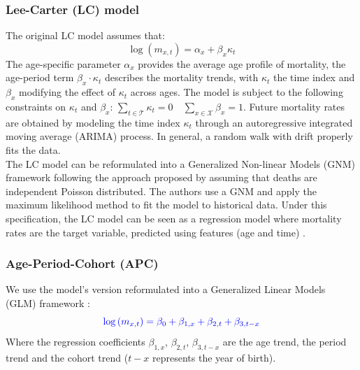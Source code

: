 \documentclass[fleqn,10pt]{wlscirep}
\begin{document}
\subsubsection*{Lee-Carter (LC) model}
The original LC model\cite{LC92} assumes that:
\begin{equation} 
\label{eq:LC}
\log{\left(m_{x,t}\right)}=\alpha_{x}+\beta_{x} \kappa_{t}
\end{equation}
The age-specific parameter $\alpha_x$ provides the average age profile of mortality, the age-period term $\beta_{x}\cdot\kappa_t$ describes the mortality trends, with $\kappa_t$ the time index and $\beta_{x}$ modifying the effect of $\kappa_t$ across ages. The model is subject to the following constraints on $\kappa_t$ and $\beta_x$: $\sum_{t \in \mathcal{T}}{\kappa_t}=0 \quad \sum_{x \in \mathcal{X}}{\beta_x}=1$.
Future mortality rates are obtained by modeling the time index $\kappa_{t}$ through an autoregressive integrated moving average (ARIMA) process. In general, a random walk with drift properly fits the data. \\
\color{blue}The LC model can be reformulated into a Generalized Non-linear Models (GNM) framework following the approach proposed by \cite{BDV2002} assuming that deaths are independent Poisson distributed. The authors use a GNM and apply the maximum likelihood method to fit the model to historical data. Under this specification, the LC model can be seen as a regression model where mortality rates are the target variable, predicted using features (age and time) \cite{RichmanWuthrich}. \color{black}

\subsubsection*{Age-Period-Cohort (APC)}
We use the model's version reformulated into a Generalized Linear Models (GLM) framework \cite{Alai2014}:
\begin{equation} 
\label{eq:APC}
\color{blue} \log{\left(m_{x,t}\right)}=\beta_{0} +\beta_{1,x}+\beta_{2,t} +\beta_{3,t-x}
\end{equation}
Where the regression coefficients $\beta_{1,x}$, $\beta_{2,t}$, \color{blue}$\beta_{3,t-x}$\color{black} are the age trend, the period trend and the cohort trend \color{blue}($t-x$ represents the year of birth)\color{black}.
\end{document}
